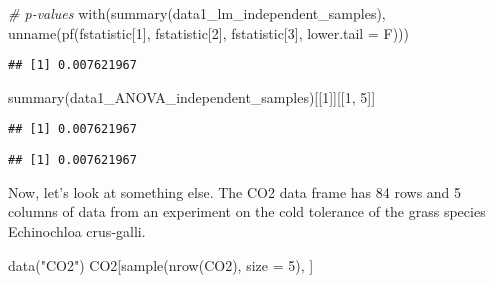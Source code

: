 \documentclass[
]{book}
\newenvironment{Shaded}{\begin{snugshade}}{\end{snugshade}}
\newcommand{\AttributeTok}[1]{\textcolor[rgb]{0.77,0.63,0.00}{#1}}
\newcommand{\CommentTok}[1]{\textcolor[rgb]{0.56,0.35,0.01}{\textit{#1}}}
\newcommand{\DecValTok}[1]{\textcolor[rgb]{0.00,0.00,0.81}{#1}}
\newcommand{\FunctionTok}[1]{\textcolor[rgb]{0.00,0.00,0.00}{#1}}
\newcommand{\NormalTok}[1]{#1}
\newcommand{\SpecialCharTok}[1]{\textcolor[rgb]{0.00,0.00,0.00}{#1}}
\newcommand{\StringTok}[1]{\textcolor[rgb]{0.31,0.60,0.02}{#1}}
\begin{document}
\begin{Shaded}
\begin{Highlighting}[]
\CommentTok{\# p{-}values}
\FunctionTok{with}\NormalTok{(}\FunctionTok{summary}\NormalTok{(data1\_lm\_independent\_samples), }\FunctionTok{unname}\NormalTok{(}\FunctionTok{pf}\NormalTok{(fstatistic[}\DecValTok{1}\NormalTok{],}
\NormalTok{    fstatistic[}\DecValTok{2}\NormalTok{], fstatistic[}\DecValTok{3}\NormalTok{], }\AttributeTok{lower.tail =}\NormalTok{ F)))}
\end{Highlighting}
\end{Shaded}

\begin{verbatim}
## [1] 0.007621967
\end{verbatim}

\begin{Shaded}
\begin{Highlighting}[]
\FunctionTok{summary}\NormalTok{(data1\_ANOVA\_independent\_samples)[[}\DecValTok{1}\NormalTok{]][[}\DecValTok{1}\NormalTok{, }\DecValTok{5}\NormalTok{]]}
\end{Highlighting}
\end{Shaded}

\begin{verbatim}
## [1] 0.007621967
\end{verbatim}

\begin{Shaded}
\end{Shaded}

\begin{verbatim}
## [1] 0.007621967
\end{verbatim}

Now, let's look at something else. The CO2 data frame has 84 rows and 5
columns of data from an experiment on the cold tolerance of the grass
species Echinochloa crus-galli.

\begin{Shaded}
\begin{Highlighting}[]
\FunctionTok{data}\NormalTok{(}\StringTok{"CO2"}\NormalTok{)}
\NormalTok{CO2[}\FunctionTok{sample}\NormalTok{(}\FunctionTok{nrow}\NormalTok{(CO2), }\AttributeTok{size =} \DecValTok{5}\NormalTok{), ]}
\end{Highlighting}
\end{Shaded}
\end{document}
